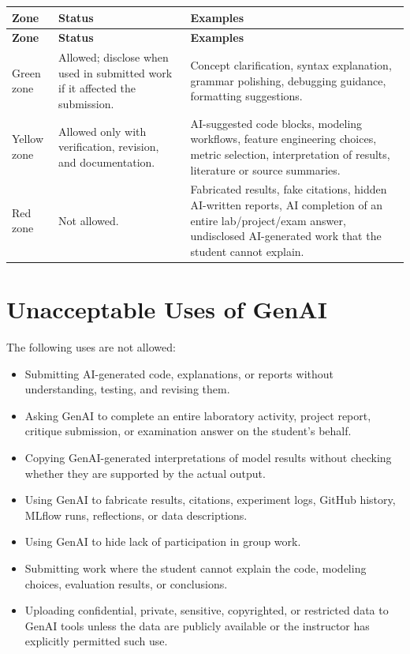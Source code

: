 \documentclass[11pt]{article}
\begin{document}
\begin{longtable}{p{}p{}p{}}
\toprule
\textbf{Zone} & \textbf{Status} & \textbf{Examples} \\
\midrule
\endfirsthead
\toprule
\textbf{Zone} & \textbf{Status} & \textbf{Examples} \\
\midrule
\endhead
\bottomrule
\endfoot
Green zone & Allowed; disclose when used in submitted work if it affected the submission. & Concept clarification, syntax explanation, grammar polishing, debugging guidance, formatting suggestions. \\
Yellow zone & Allowed only with verification, revision, and documentation. & AI-suggested code blocks, modeling workflows, feature engineering choices, metric selection, interpretation of results, literature or source summaries. \\
Red zone & Not allowed. & Fabricated results, fake citations, hidden AI-written reports, AI completion of an entire lab/project/exam answer, undisclosed AI-generated work that the student cannot explain. \\
\end{longtable}

\section{Unacceptable Uses of GenAI}

The following uses are not allowed:

\begin{itemize}
    \item Submitting AI-generated code, explanations, or reports without understanding, testing, and revising them.
    \item Asking GenAI to complete an entire laboratory activity, project report, critique submission, or examination answer on the student's behalf.
    \item Copying GenAI-generated interpretations of model results without checking whether they are supported by the actual output.
    \item Using GenAI to fabricate results, citations, experiment logs, GitHub history, MLflow runs, reflections, or data descriptions.
    \item Using GenAI to hide lack of participation in group work.
    \item Submitting work where the student cannot explain the code, modeling choices, evaluation results, or conclusions.
    \item Uploading confidential, private, sensitive, copyrighted, or restricted data to GenAI tools unless the data are publicly available or the instructor has explicitly permitted such use.
\end{itemize}
\end{document}
